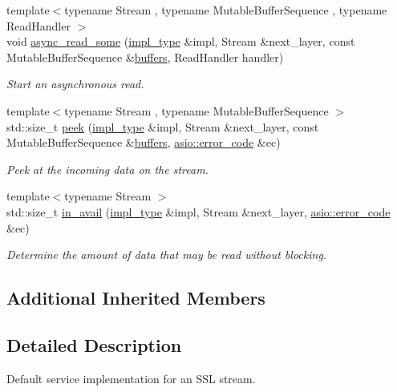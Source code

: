 \begin{DoxyCompactItemize}
{\footnotesize template$<$typename Stream , typename Mutable\+Buffer\+Sequence , typename Read\+Handler $>$ }\\void \hyperlink{classasio_1_1ssl_1_1old_1_1stream__service_ab89bc09972095a506168294b62d76bf5}{async\+\_\+read\+\_\+some} (\hyperlink{classasio_1_1ssl_1_1old_1_1stream__service_a7e2131ccd16fbc04d0f86c61288e4175}{impl\+\_\+type} \&impl, Stream \&next\+\_\+layer, const Mutable\+Buffer\+Sequence \&\hyperlink{group__async__read_ga54dede45c3175148a77fe6635222c47d}{buffers}, Read\+Handler handler)
\begin{DoxyCompactList}\small\item\em Start an asynchronous read. \end{DoxyCompactList}\item 
{\footnotesize template$<$typename Stream , typename Mutable\+Buffer\+Sequence $>$ }\\std\+::size\+\_\+t \hyperlink{classasio_1_1ssl_1_1old_1_1stream__service_ab159d695dc0f5b7f7c23ec87e18ce54d}{peek} (\hyperlink{classasio_1_1ssl_1_1old_1_1stream__service_a7e2131ccd16fbc04d0f86c61288e4175}{impl\+\_\+type} \&impl, Stream \&next\+\_\+layer, const Mutable\+Buffer\+Sequence \&\hyperlink{group__async__read_ga54dede45c3175148a77fe6635222c47d}{buffers}, \hyperlink{classasio_1_1error__code}{asio\+::error\+\_\+code} \&ec)
\begin{DoxyCompactList}\small\item\em Peek at the incoming data on the stream. \end{DoxyCompactList}\item 
{\footnotesize template$<$typename Stream $>$ }\\std\+::size\+\_\+t \hyperlink{classasio_1_1ssl_1_1old_1_1stream__service_ac45414841a8792cfa7f924d2110e717e}{in\+\_\+avail} (\hyperlink{classasio_1_1ssl_1_1old_1_1stream__service_a7e2131ccd16fbc04d0f86c61288e4175}{impl\+\_\+type} \&impl, Stream \&next\+\_\+layer, \hyperlink{classasio_1_1error__code}{asio\+::error\+\_\+code} \&ec)
\begin{DoxyCompactList}\small\item\em Determine the amount of data that may be read without blocking. \end{DoxyCompactList}\end{DoxyCompactItemize}
\subsection*{Additional Inherited Members}


\subsection{Detailed Description}
Default service implementation for an S\+S\+L stream. 

